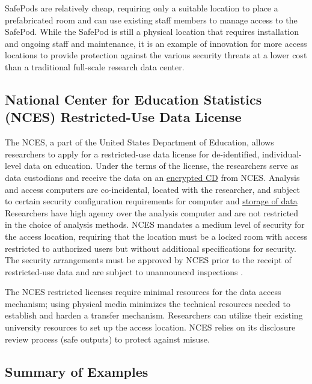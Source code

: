 SafePods are relatively cheap, requiring only a suitable location to place a prefabricated room and can use existing staff members to manage access to the SafePod. While the SafePod is still a physical location that requires installation and ongoing staff and maintenance, it is an example of innovation for more access locations to provide protection against the various security threats at a lower cost than a traditional full-scale research data center.

\hypertarget{national-center-for-education-statistics-nces-restricted-use-data-license}{%
\subsection{National Center for Education Statistics (NCES) Restricted-Use Data License}\label{national-center-for-education-statistics-nces-restricted-use-data-license}}

The NCES, a part of the United States Department of Education, allows researchers to apply for a restricted-use data license for de-identified, individual-level data on education. Under the terms of the license, the researchers serve as data custodians and receive the data on an \protect\hyperlink{physical-media}{encrypted CD} from NCES. Analysis and access computers are co-incidental, located with the researcher, and subject to certain security configuration requirements for computer and \protect\hyperlink{storage-of-data}{storage of data} Researchers have high agency over the analysis computer and are not restricted in the choice of analysis methods. NCES mandates a medium level of security for the access location, requiring that the location must be a locked room with access restricted to authorized users but without additional specifications for security. The security arrangements must be approved by NCES prior to the receipt of restricted-use data and are subject to unannounced inspections \citep{nationalcenterforeducationstatistics2019}.

The NCES restricted licenses require minimal resources for the data access mechanism; using physical media minimizes the technical resources needed to establish and harden a transfer mechanism. Researchers can utilize their existing university resources to set up the access location. NCES relies on its disclosure review process (safe outputs) to protect against misuse.

\hypertarget{summary-of-examples}{%
\subsection{Summary of Examples}\label{summary-of-examples}}

